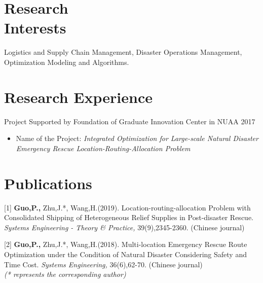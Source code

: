 \documentclass[margin]{res}
\begin{document}
\begin{resume}
\section{\sc Research \\Interests}
Logistics and Supply Chain Management, 
Disaster Operations Management, 
Optimization Modeling and Algorithms.


\section{\sc Research Experience}
Project Supported by Foundation of Graduate Innovation Center in NUAA \hfill 2017
\begin{itemize} \itemsep -2pt  %
\item Name of the Project: {\it Integrated Optimization for Large-scale Natural Disaster Emergency Rescue Location-Routing-Allocation Problem}
\end{itemize}


\section{\sc Publications}
[1] \textbf{Guo,P.,} Zhu,J.*, Wang,H.(2019). Location-routing-allocation Problem with Consolidated Shipping of Heterogeneous Relief Supplies in Post-disaster Rescue. \textit{Systems Engineering - Theory \& Practice,} 39(9),2345-2360. (Chinese journal)

[2] \textbf{Guo,P.,} Zhu,J.*, Wang,H.(2018). Multi-location Emergency Rescue Route Optimization under the Condition of Natural Disaster Considering Safety and Time Cost. \textit{Systems Engineering,} 36(6),62-70. (Chinese journal) \\
\textit{(* represents the corresponding author)}



\end{resume}
\end{document}
